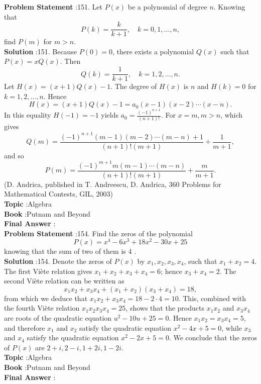 \documentclass[10pt]{article}
\begin{document}
\textbf{Problem Statement} :151. Let $P(x)$ be a polynomial of degree $n$. Knowing that$$ P(k)=\frac{k}{k+1}, \quad k=0,1, \ldots, n, $$find $P(m)$ for $m>n$.\\
\textbf{Solution} :151. Because $P(0)=0$, there exists a polynomial $Q(x)$ such that $P(x)=x Q(x)$. Then$$ Q(k)=\frac{1}{k+1}, \quad k=1,2, \ldots, n . $$Let $H(x)=(x+1) Q(x)-1$. The degree of $H(x)$ is $n$ and $H(k)=0$ for $k=1,2, \ldots, n$. Hence$$ H(x)=(x+1) Q(x)-1=a_{0}(x-1)(x-2) \cdots(x-n) . $$In this equality $H(-1)=-1$ yields $a_{0}=\frac{(-1)^{n+1}}{(n+1) !}$. For $x=m, m>n$, which gives$$ Q(m)=\frac{(-1)^{n+1}(m-1)(m-2) \cdots(m-n)+1}{(n+1) !(m+1)}+\frac{1}{m+1}, $$and so $$ P(m)=\frac{(-1)^{m+1} m(m-1) \cdots(m-n)}{(n+1) !(m+1)}+\frac{m}{m+1} . $$(D. Andrica, published in T. Andreescu, D. Andrica, 360 Problems for Mathematical Contests, GIL, 2003)\\
\textbf{Topic} :Algebra\\
\textbf{Book} :Putnam and Beyond\\
\textbf{Final Answer} :\\


\textbf{Problem Statement} :154. Find the zeros of the polynomial$$ P(x)=x^{4}-6 x^{3}+18 x^{2}-30 x+25 $$knowing that the sum of two of them is 4 . \\
\textbf{Solution} :154. Denote the zeros of $P(x)$ by $x_{1}, x_{2}, x_{3}, x_{4}$, such that $x_{1}+x_{2}=4$. The first Viète relation gives $x_{1}+x_{2}+x_{3}+x_{4}=6$; hence $x_{3}+x_{4}=2$. The second Viète relation can be written as$$ x_{1} x_{2}+x_{3} x_{4}+\left(x_{1}+x_{2}\right)\left(x_{3}+x_{4}\right)=18, $$from which we deduce that $x_{1} x_{2}+x_{3} x_{4}=18-2 \cdot 4=10$. This, combined with the fourth Viète relation $x_{1} x_{2} x_{3} x_{4}=25$, shows that the products $x_{1} x_{2}$ and $x_{3} x_{4}$ are roots of the quadratic equation $u^{2}-10 u+25=0$. Hence $x_{1} x_{2}=x_{3} x_{4}=5$, and therefore $x_{1}$ and $x_{2}$ satisfy the quadratic equation $x^{2}-4 x+5=0$, while $x_{3}$ and $x_{4}$ satisfy the quadratic equation $x^{2}-2 x+5=0$. We conclude that the zeros of $P(x)$ are $2+i, 2-i, 1+2 i, 1-2 i$. \\
\textbf{Topic} :Algebra\\
\textbf{Book} :Putnam and Beyond\\
\textbf{Final Answer} :\\
\end{document}
